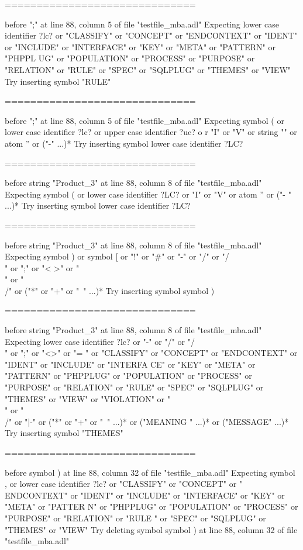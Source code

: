 \begin{description}
\begin{haskell}
==============================

before ";" at line 88, column 5 of file "testfile_mba.adl"
Expecting lower case identifier ?lc? or "CLASSIFY" or "CONCEPT" or "ENDCONTEXT"
or "IDENT" or "INCLUDE" or "INTERFACE" or "KEY" or "META" or "PATTERN" or "PHPPL
UG" or "POPULATION" or "PROCESS" or "PURPOSE" or "RELATION" or "RULE" or "SPEC"
or "SQLPLUG" or "THEMES" or "VIEW"
Try inserting symbol "RULE"

==============================

before ";" at line 88, column 5 of file "testfile_mba.adl"
Expecting symbol ( or lower case identifier ?lc? or upper case identifier ?uc? o
r "I" or "V" or string "" or atom '' or ("-" ...)*
Try inserting symbol lower case identifier ?LC?

==============================

before string "Product_3" at line 88, column 8 of file "testfile_mba.adl"
Expecting symbol ( or lower case identifier ?LC? or "I" or "V" or atom '' or ("-
" ...)*
Try inserting symbol lower case identifier ?LC?

==============================

before string "Product_3" at line 88, column 8 of file "testfile_mba.adl"
Expecting symbol ) or symbol [ or "!" or "#" or "-" or "/" or "/\\" or ";" or "<
>" or "\\" or "\\/" or ("*" or "+" or "~" ...)*
Try inserting symbol symbol )

==============================

before string "Product_3" at line 88, column 8 of file "testfile_mba.adl"
Expecting lower case identifier ?lc? or "-" or "/" or "/\\" or ";" or "<>" or "=
" or "CLASSIFY" or "CONCEPT" or "ENDCONTEXT" or "IDENT" or "INCLUDE" or "INTERFA
CE" or "KEY" or "META" or "PATTERN" or "PHPPLUG" or "POPULATION" or "PROCESS" or
 "PURPOSE" or "RELATION" or "RULE" or "SPEC" or "SQLPLUG" or "THEMES" or "VIEW"
or "VIOLATION" or "\\" or "\\/" or "|-" or ("*" or "+" or "~" ...)* or ("MEANING
" ...)* or ("MESSAGE" ...)*
Try inserting symbol "THEMES"

==============================

before symbol ) at line 88, column 32 of file "testfile_mba.adl"
Expecting symbol , or lower case identifier ?lc? or "CLASSIFY" or "CONCEPT" or "
ENDCONTEXT" or "IDENT" or "INCLUDE" or "INTERFACE" or "KEY" or "META" or "PATTER
N" or "PHPPLUG" or "POPULATION" or "PROCESS" or "PURPOSE" or "RELATION" or "RULE
" or "SPEC" or "SQLPLUG" or "THEMES" or "VIEW"
Try deleting symbol symbol ) at line 88, column 32 of file "testfile_mba.adl"


\end{haskell}
\end{description}
